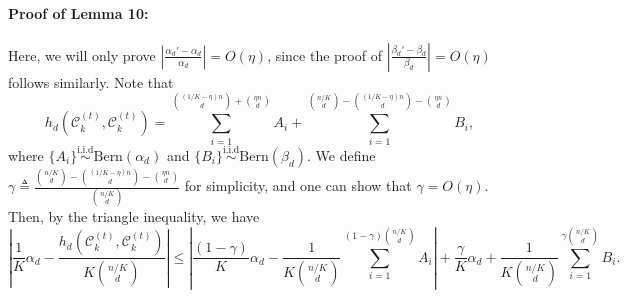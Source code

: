 \documentclass{article}
\newcommand\af{\alpha_d}
\newcommand\bt{\beta_d}
\begin{document}
 \paragraph{Proof of Lemma 10:} 
    Here, we will only prove $\left| \frac{\alpha_d'-\af }{\af } \right| = O(\eta)$, since the proof of $\left| \frac{\beta_d'-\bt }{\bt } \right| = O(\eta)$ follows similarly. Note that
\begin{equation}\label{ab1}
	h_d(\mathcal{C}_k^{(t)}, \mathcal{C}_k^{(t)}) = \sum_{i=1}^{\binom{(1/K-\eta)n}{d}+\binom{\eta n}{d}} A_i + \sum_{i=1}^{\binom{n/K}{d}-\binom{(1/K-\eta)n}{d}-\binom{\eta n}{d}} B_i,
\end{equation}
where $\{A_i\} \overset{\text{i.i.d}}{\sim} \text{Bern}(\af)$ and $\{B_i\} \overset{\text{i.i.d}}{\sim} \text{Bern}(\bt)$. We define $\gamma \triangleq \frac{\binom{n/K}{d}-\binom{(1/K-\eta)n}{d}-\binom{\eta n}{d}}{\binom{n/K}{d}}$ for simplicity, and one can show that $\gamma = O(\eta)$. Then, by the triangle inequality, we have
\begin{equation}\label{ab2}
	\left| \frac{1}{K} \af - \frac{h_d(\mathcal{C}_k^{(t)}, \mathcal{C}_k^{(t)})}{K\binom{n/K}{d}}  \right| \leq \left| \frac{(1-\gamma)}{K} \af - \frac{1}{K\binom{n/K}{d}} \sum_{i=1}^{(1-\gamma)\binom{n/K}{d}} A_i \right| + \frac{\gamma}{K}\af + \frac{1}{K\binom{n/K}{d}} \sum_{i=1}^{\gamma \binom{n/K}{d}} B_i.
\end{equation}
\end{document}
